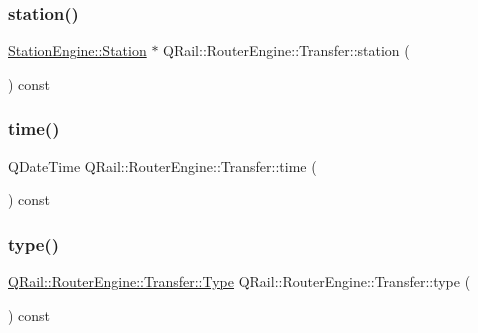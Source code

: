 \mbox{\label{classQRail_1_1RouterEngine_1_1Transfer_aa16ed17bef90a4ecdcb7b6c03651b9dd}} 
\subsubsection{\texorpdfstring{station()}{station()}}
{\footnotesize\ttfamily \mbox{\hyperlink{classQRail_1_1StationEngine_1_1Station}{Station\+Engine\+::\+Station}} $\ast$ Q\+Rail\+::\+Router\+Engine\+::\+Transfer\+::station (\begin{DoxyParamCaption}{ }\end{DoxyParamCaption}) const}

\mbox{\label{classQRail_1_1RouterEngine_1_1Transfer_ae6dc48066916082dbd30fa1de56cd66c}} 
\subsubsection{\texorpdfstring{time()}{time()}}
{\footnotesize\ttfamily Q\+Date\+Time Q\+Rail\+::\+Router\+Engine\+::\+Transfer\+::time (\begin{DoxyParamCaption}{ }\end{DoxyParamCaption}) const}

\mbox{\label{classQRail_1_1RouterEngine_1_1Transfer_a61514c74c7f14ae9626aa4308c95d016}} 
\subsubsection{\texorpdfstring{type()}{type()}}
{\footnotesize\ttfamily \mbox{\hyperlink{classQRail_1_1RouterEngine_1_1Transfer_a5a0b372acbdfb9381fb937bf163edfa6}{Q\+Rail\+::\+Router\+Engine\+::\+Transfer\+::\+Type}} Q\+Rail\+::\+Router\+Engine\+::\+Transfer\+::type (\begin{DoxyParamCaption}{ }\end{DoxyParamCaption}) const}


